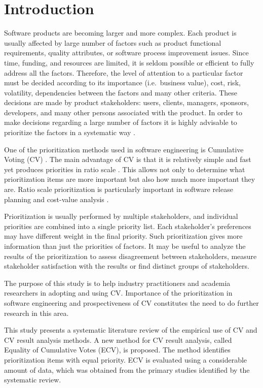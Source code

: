 \section{\label{intro}Introduction}

Software products are becoming larger and more complex. Each product
is usually affected by large number of factors such as product functional
requirements, quality attributes, or software process improvement
issues. Since time, funding, and resources are limited, it is seldom
possible or efficient to fully address all the factors. Therefore,
the level of attention to a particular factor must be decided according
to its importance (i.e.\ business value), cost, risk, volatility, 
dependencies between the factors and many other criteria. 
These decisions are made by product stakeholders:
users, clients, managers, sponsors, developers, and many other persons
associated with the product. In order to make decisions regarding a
large number of factors it is highly advisable to prioritize the factors
in a systematic way \citep{Berander2005}.

One of the prioritization methods used in software engineering is Cumulative Voting (CV)
\citep{Leffingwell1999}.
The main advantage of CV is that it is relatively simple and fast yet produces priorities in ratio scale 
\citep{Berander2005,Ahl2005}.
This allows not only to determine what prioritization items are more important but also how much more important they are.
Ratio scale prioritization is particularly important in software release planning and cost-value analysis  \citep{Berander2006a, Karlsson1997}.

Prioritization is usually performed by multiple stakeholders,
and individual priorities are combined into a single priority list.
Each stakeholder's preferences may have different weight in the final priority.
Such prioritization gives more information than just the priorities of factors.
It may be useful to analyze the results of the prioritization to assess disagreement between stakeholders, measure stakeholder satisfaction with the results or find distinct groups of stakeholders.

The purpose of this study is to help industry practitioners and academia researchers in adopting and using CV.
Importance of the prioritization in software engineering and prospectiveness of CV constitutes the need to do further research in this area.

This study presents a systematic literature review of the empirical use of CV and CV result analysis methods.
A new method for CV result analysis, called Equality of Cumulative Votes (ECV), is proposed.
The method identifies prioritization items with equal priority.
ECV is evaluated using a considerable amount of data, which was obtained from the primary studies identified by the systematic review.

